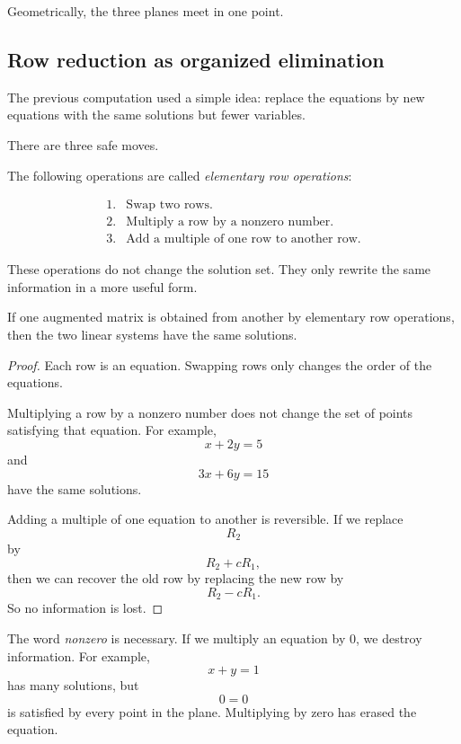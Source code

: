 Geometrically, the three planes meet in one point.

\subsection{Row reduction as organized elimination}

The previous computation used a simple idea: replace the equations by new equations
with the same solutions but fewer variables.

There are three safe moves.

\begin{definition}
The following operations are called \emph{elementary row operations}:

\[
\begin{array}{ll}
1. & \text{Swap two rows.}\\[0.2em]
2. & \text{Multiply a row by a nonzero number.}\\[0.2em]
3. & \text{Add a multiple of one row to another row.}
\end{array}
\]
\end{definition}

These operations do not change the solution set.  They only rewrite the same
information in a more useful form.

\begin{theorem}
If one augmented matrix is obtained from another by elementary row operations, then
the two linear systems have the same solutions.
\end{theorem}

\begin{proof}
Each row is an equation.  Swapping rows only changes the order of the equations.

Multiplying a row by a nonzero number does not change the set of points satisfying
that equation.  For example,
\[
    x+2y=5
\]
and
\[
    3x+6y=15
\]
have the same solutions.

Adding a multiple of one equation to another is reversible.  If we replace
\[
    R_2
\]
by
\[
    R_2+cR_1,
\]
then we can recover the old row by replacing the new row by
\[
    R_2-cR_1.
\]
So no information is lost.
\end{proof}

The word \emph{nonzero} is necessary.  If we multiply an equation by \(0\), we destroy
information.  For example,
\[
    x+y=1
\]
has many solutions, but
\[
    0=0
\]
is satisfied by every point in the plane.  Multiplying by zero has erased the equation.

